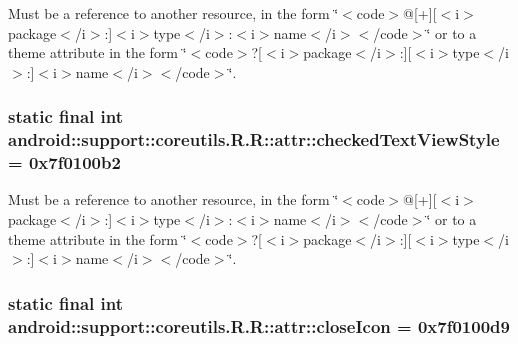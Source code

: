 Must be a reference to another resource, in the form \char`\"{}$<$code$>$@\mbox{[}+\mbox{]}\mbox{[}$<$i$>$package$<$/i$>$:\mbox{]}$<$i$>$type$<$/i$>$:$<$i$>$name$<$/i$>$$<$/code$>$\char`\"{} or to a theme attribute in the form \char`\"{}$<$code$>$?\mbox{[}$<$i$>$package$<$/i$>$:\mbox{]}\mbox{[}$<$i$>$type$<$/i$>$:\mbox{]}$<$i$>$name$<$/i$>$$<$/code$>$\char`\"{}. \hypertarget{classandroid_1_1support_1_1coreutils_1_1_r_1_1attr_0b3706214e03da525cbdf782a82cf11c}{
\subsubsection[{checkedTextViewStyle}]{\setlength{\rightskip}{0pt plus 5cm}static final int android::support::coreutils.R.R::attr::checkedTextViewStyle = 0x7f0100b2}}
\label{classandroid_1_1support_1_1coreutils_1_1_r_1_1attr_0b3706214e03da525cbdf782a82cf11c}


Must be a reference to another resource, in the form \char`\"{}$<$code$>$@\mbox{[}+\mbox{]}\mbox{[}$<$i$>$package$<$/i$>$:\mbox{]}$<$i$>$type$<$/i$>$:$<$i$>$name$<$/i$>$$<$/code$>$\char`\"{} or to a theme attribute in the form \char`\"{}$<$code$>$?\mbox{[}$<$i$>$package$<$/i$>$:\mbox{]}\mbox{[}$<$i$>$type$<$/i$>$:\mbox{]}$<$i$>$name$<$/i$>$$<$/code$>$\char`\"{}. \hypertarget{classandroid_1_1support_1_1coreutils_1_1_r_1_1attr_bbbe5cab05b584404c42240de629f04d}{
\subsubsection[{closeIcon}]{\setlength{\rightskip}{0pt plus 5cm}static final int android::support::coreutils.R.R::attr::closeIcon = 0x7f0100d9}}
\label{classandroid_1_1support_1_1coreutils_1_1_r_1_1attr_bbbe5cab05b584404c42240de629f04d}


